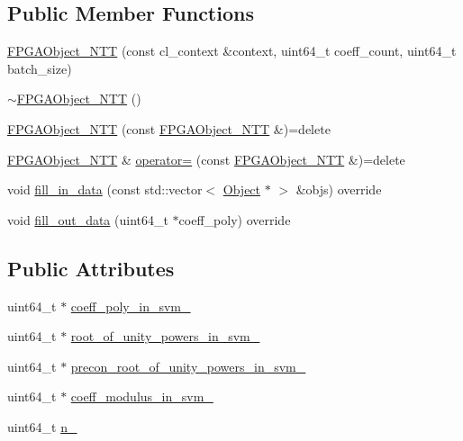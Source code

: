 \subsection*{Public Member Functions}
\begin{DoxyCompactItemize}
\item 
\hyperlink{structintel_1_1hexl_1_1fpga_1_1FPGAObject__NTT_a0ea057e0cc2e3a1b13917ac8f1bd1af3}{F\-P\-G\-A\-Object\-\_\-\-N\-T\-T} (const cl\-\_\-context \&context, uint64\-\_\-t coeff\-\_\-count, uint64\-\_\-t batch\-\_\-size)
\item 
\hyperlink{structintel_1_1hexl_1_1fpga_1_1FPGAObject__NTT_abae77f82236fa240111b32bd1b665a21}{$\sim$\-F\-P\-G\-A\-Object\-\_\-\-N\-T\-T} ()
\item 
\hyperlink{structintel_1_1hexl_1_1fpga_1_1FPGAObject__NTT_aae2ff813a10bfdeaa49a4e826545aff0}{F\-P\-G\-A\-Object\-\_\-\-N\-T\-T} (const \hyperlink{structintel_1_1hexl_1_1fpga_1_1FPGAObject__NTT}{F\-P\-G\-A\-Object\-\_\-\-N\-T\-T} \&)=delete
\item 
\hyperlink{structintel_1_1hexl_1_1fpga_1_1FPGAObject__NTT}{F\-P\-G\-A\-Object\-\_\-\-N\-T\-T} \& \hyperlink{structintel_1_1hexl_1_1fpga_1_1FPGAObject__NTT_aad29cb94fc8916e444d146820d0fd673}{operator=} (const \hyperlink{structintel_1_1hexl_1_1fpga_1_1FPGAObject__NTT}{F\-P\-G\-A\-Object\-\_\-\-N\-T\-T} \&)=delete
\item 
void \hyperlink{structintel_1_1hexl_1_1fpga_1_1FPGAObject__NTT_a3aa5e6c85ae154bcf98ba99205feda16}{fill\-\_\-in\-\_\-data} (const std\-::vector$<$ \hyperlink{structintel_1_1hexl_1_1fpga_1_1Object}{Object} $\ast$ $>$ \&objs) override
\item 
void \hyperlink{structintel_1_1hexl_1_1fpga_1_1FPGAObject__NTT_a4f31676fdaf820560f625d2f468da397}{fill\-\_\-out\-\_\-data} (uint64\-\_\-t $\ast$coeff\-\_\-poly) override
\end{DoxyCompactItemize}
\subsection*{Public Attributes}
\begin{DoxyCompactItemize}
\item 
uint64\-\_\-t $\ast$ \hyperlink{structintel_1_1hexl_1_1fpga_1_1FPGAObject__NTT_a899dea2730faece216ae48d60bb14b07}{coeff\-\_\-poly\-\_\-in\-\_\-svm\-\_\-}
\item 
uint64\-\_\-t $\ast$ \hyperlink{structintel_1_1hexl_1_1fpga_1_1FPGAObject__NTT_a1263c41528af5e32878a535d5422b33d}{root\-\_\-of\-\_\-unity\-\_\-powers\-\_\-in\-\_\-svm\-\_\-}
\item 
uint64\-\_\-t $\ast$ \hyperlink{structintel_1_1hexl_1_1fpga_1_1FPGAObject__NTT_a7ac4c0e1180cf9b29998f1e2ae1c074c}{precon\-\_\-root\-\_\-of\-\_\-unity\-\_\-powers\-\_\-in\-\_\-svm\-\_\-}
\item 
uint64\-\_\-t $\ast$ \hyperlink{structintel_1_1hexl_1_1fpga_1_1FPGAObject__NTT_aef6ec35bf5733224ffd5d1be64de4ab1}{coeff\-\_\-modulus\-\_\-in\-\_\-svm\-\_\-}
\item 
uint64\-\_\-t \hyperlink{structintel_1_1hexl_1_1fpga_1_1FPGAObject__NTT_aa7b2933a6ad042a0ec97aa5b7eff3c5e}{n\-\_\-}
\end{DoxyCompactItemize}

